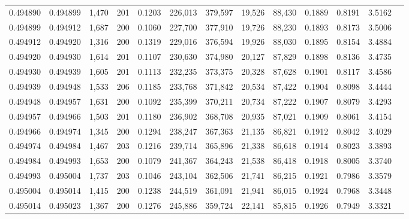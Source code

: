 \begin{tabular}{rrrrrrrrrrrrr}
0.494890 & 0.494899 & 1,470 & 201 &                                     0.1203 & 226,013 & 379,597 &  19,526 &  88,430 & 0.1889 & 0.8191 & 3.5162 \\
0.494899 & 0.494912 & 1,687 & 200 &                                     0.1060 & 227,700 & 377,910 &  19,726 &  88,230 & 0.1893 & 0.8173 & 3.5006 \\
0.494912 & 0.494920 & 1,316 & 200 &                                     0.1319 & 229,016 & 376,594 &  19,926 &  88,030 & 0.1895 & 0.8154 & 3.4884 \\
0.494920 & 0.494930 & 1,614 & 201 &                                     0.1107 & 230,630 & 374,980 &  20,127 &  87,829 & 0.1898 & 0.8136 & 3.4735 \\
0.494930 & 0.494939 & 1,605 & 201 &                                     0.1113 & 232,235 & 373,375 &  20,328 &  87,628 & 0.1901 & 0.8117 & 3.4586 \\
0.494939 & 0.494948 & 1,533 & 206 &                                     0.1185 & 233,768 & 371,842 &  20,534 &  87,422 & 0.1904 & 0.8098 & 3.4444 \\
0.494948 & 0.494957 & 1,631 & 200 &                                     0.1092 & 235,399 & 370,211 &  20,734 &  87,222 & 0.1907 & 0.8079 & 3.4293 \\
0.494957 & 0.494966 & 1,503 & 201 &                                     0.1180 & 236,902 & 368,708 &  20,935 &  87,021 & 0.1909 & 0.8061 & 3.4154 \\
0.494966 & 0.494974 & 1,345 & 200 &                                     0.1294 & 238,247 & 367,363 &  21,135 &  86,821 & 0.1912 & 0.8042 & 3.4029 \\
0.494974 & 0.494984 & 1,467 & 203 &                                     0.1216 & 239,714 & 365,896 &  21,338 &  86,618 & 0.1914 & 0.8023 & 3.3893 \\
0.494984 & 0.494993 & 1,653 & 200 &                                     0.1079 & 241,367 & 364,243 &  21,538 &  86,418 & 0.1918 & 0.8005 & 3.3740 \\
0.494993 & 0.495004 & 1,737 & 203 &                                     0.1046 & 243,104 & 362,506 &  21,741 &  86,215 & 0.1921 & 0.7986 & 3.3579 \\
0.495004 & 0.495014 & 1,415 & 200 &                                     0.1238 & 244,519 & 361,091 &  21,941 &  86,015 & 0.1924 & 0.7968 & 3.3448 \\
0.495014 & 0.495023 & 1,367 & 200 &                                     0.1276 & 245,886 & 359,724 &  22,141 &  85,815 & 0.1926 & 0.7949 & 3.3321 \\

\end{tabular}
